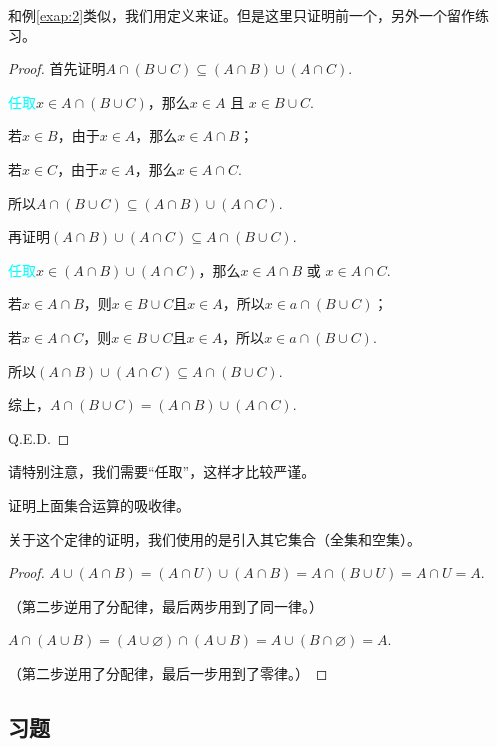 \documentclass[lang=cn,math=cm,chinesefont=nofont,11pt,scheme=chinese,onecol]{elegantbook}
\begin{document}
  和例\ref{exap:2}类似，我们用定义来证。但是这里只证明前一个，另外一个留作练习。

\begin{proof}
  首先证明$A\cap(B\cup C)\subseteq(A\cap B)\cup(A\cap C)$.

  \textcolor{cyan}{任取}\enspace$x\in A\cap(B\cup C)$，那么$x\in A\text{ 且 }x\in B\cup C$.

  若$x\in B$，由于$x\in A$，那么$x\in A\cap B$；

  若$x\in C$，由于$x\in A$，那么$x\in A\cap C$.

  所以$A\cap(B\cup C)\subseteq(A\cap B)\cup(A\cap C)$.

  \hspace*{\fill}

  再证明$(A\cap B)\cup(A\cap C)\subseteq A\cap(B\cup C)$.

  \textcolor{cyan}{任取}\enspace$x\in (A\cap B)\cup(A\cap C)$，那么$x\in A\cap B\text{ 或 }x\in A\cap C$.

  若$x\in A\cap B$，则$x\in B\cup C\text{且}x\in A$，所以$x\in a\cap(B\cup C)$；

  若$x\in A\cap C$，则$x\in B\cup C\text{且}x\in A$，所以$x\in a\cap(B\cup C)$.

  所以$(A\cap B)\cup(A\cap C)\subseteq A\cap(B\cup C)$.

  综上，$A\cap(B\cup C)=(A\cap B)\cup(A\cap C).$

  Q.E.D.
\end{proof}
\begin{remark}
  请特别注意，我们需要“任取”，这样才比较严谨。
\end{remark}

\hspace*{\fill}

\begin{example}
  证明上面集合运算的吸收律。
\end{example}
关于这个定律的证明，我们使用的是引入其它集合（全集和空集）。

\begin{proof}
  $A\cup (A\cap B)=(A\cap U)\cup(A\cap B)=A\cap(B\cup U)=A\cap U=A.$

  （第二步逆用了分配律，最后两步用到了同一律。）

  $A\cap(A\cup B)=(A\cup\varnothing)\cap(A\cup B)=A\cup(B\cap\varnothing)=A.$

  （第二步逆用了分配律，最后一步用到了零律。）
\end{proof}

\subsection{习题}
\end{document}
